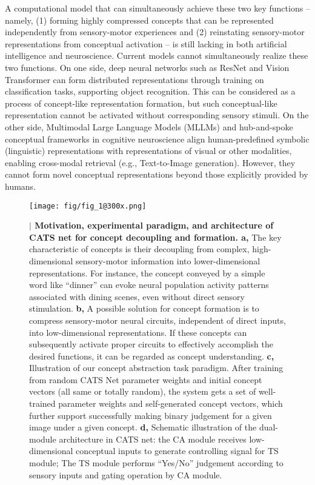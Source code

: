 \documentclass[pdflatex,sn-mathphys-num,lineno]{sn-jnl}%
\begin{document}
\begin{CJK}{UTF8}{gbsn}
A computational model that can simultaneously achieve these two key functions – namely, (1) forming highly compressed concepts that can be represented independently from sensory-motor experiences and (2) reinstating sensory-motor representations from conceptual activation – is still lacking in both artificial intelligence and neuroscience. Current models cannot simultaneously realize these two functions. On one side, deep neural networks such as ResNet and Vision Transformer \cite{he_deep_2016,dosovitskiy_image_2021} can form distributed representations through training on classification tasks, supporting object recognition. This can be considered as a process of concept-like representation formation, but such conceptual-like representation cannot be activated without corresponding sensory stimuli. On the other side, Multimodal Large Language Models (MLLMs) \cite{radford_learning_2021,li_blip-2_2023,wu_deepseek-vl2_2024} and hub-and-spoke conceptual frameworks in cognitive neuroscience \cite{ralph_neural_2017,jackson_reverse-engineering_2021} align human-predefined symbolic (linguistic) representations with representations of visual or other modalities, enabling cross-modal retrieval (e.g., Text-to-Image generation). However, they cannot form novel conceptual representations beyond those explicitly provided by humans.

\begin{figure}[htbp]
\centering
\texttt{[image: fig/fig\_1@300x.png]}
\caption{\textbf{$\vert$ Motivation, experimental paradigm, and architecture of CATS net for concept decoupling and  formation. a,} The key characteristic of concepts is their decoupling from complex, high-dimensional sensory-motor information into lower-dimensional representations. For instance, the concept conveyed by a simple word like “dinner” can evoke neural population activity patterns associated with dining scenes, even without direct sensory stimulation. \textbf{b,}  A possible solution for concept formation is to compress sensory-motor neural circuits, independent of direct inputs, into low-dimensional representations. If these concepts can subsequently activate proper circuits to effectively accomplish the desired functions, it can be regarded as concept understanding. \textbf{c,} Illustration of our concept abstraction task paradigm. After training from random CATS Net parameter weights and initial concept vectors (all same or totally random), the system gets a set of well-trained parameter weights and self-generated concept vectors, which further support successfully making binary judgement for a given image under a given concept. \textbf{d,} Schematic illustration of the dual-module architecture in CATS net: the CA module receives low-dimensional conceptual inputs to generate controlling signal for TS module; The TS module performs “Yes/No” judgement according to sensory inputs and gating operation by CA module.}
\label{fig1}
\end{figure}



\end{CJK}
\end{document}
